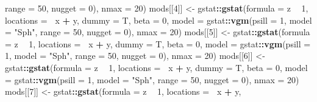 \documentclass[
]{article}
\newenvironment{Shaded}{\begin{snugshade}}{\end{snugshade}}
\newcommand{\DataTypeTok}[1]{\textcolor[rgb]{0.13,0.29,0.53}{#1}}
\newcommand{\DecValTok}[1]{\textcolor[rgb]{0.00,0.00,0.81}{#1}}
\newcommand{\KeywordTok}[1]{\textcolor[rgb]{0.13,0.29,0.53}{\textbf{#1}}}
\newcommand{\NormalTok}[1]{#1}
\newcommand{\OperatorTok}[1]{\textcolor[rgb]{0.81,0.36,0.00}{\textbf{#1}}}
\newcommand{\StringTok}[1]{\textcolor[rgb]{0.31,0.60,0.02}{#1}}
\begin{document}
\begin{Shaded}
\begin{Highlighting}[]
        \DataTypeTok{range =} \DecValTok{50}\NormalTok{, }\DataTypeTok{nugget =} \DecValTok{0}\NormalTok{), }\DataTypeTok{nmax =} \DecValTok{20}\NormalTok{)}
\NormalTok{mods[[}\DecValTok{4}\NormalTok{]] <-}\StringTok{ }\NormalTok{gstat}\OperatorTok{::}\KeywordTok{gstat}\NormalTok{(}\DataTypeTok{formula =}\NormalTok{ z }\OperatorTok{~}\StringTok{ }\DecValTok{1}\NormalTok{, }\DataTypeTok{locations =} \OperatorTok{~}\NormalTok{x }\OperatorTok{+}\StringTok{ }\NormalTok{y, }
    \DataTypeTok{dummy =}\NormalTok{ T, }\DataTypeTok{beta =} \DecValTok{0}\NormalTok{, }\DataTypeTok{model =}\NormalTok{ gstat}\OperatorTok{::}\KeywordTok{vgm}\NormalTok{(}\DataTypeTok{psill =} \DecValTok{1}\NormalTok{, }\DataTypeTok{model =} \StringTok{"Sph"}\NormalTok{, }
        \DataTypeTok{range =} \DecValTok{50}\NormalTok{, }\DataTypeTok{nugget =} \DecValTok{0}\NormalTok{), }\DataTypeTok{nmax =} \DecValTok{20}\NormalTok{)}
\NormalTok{mods[[}\DecValTok{5}\NormalTok{]] <-}\StringTok{ }\NormalTok{gstat}\OperatorTok{::}\KeywordTok{gstat}\NormalTok{(}\DataTypeTok{formula =}\NormalTok{ z }\OperatorTok{~}\StringTok{ }\DecValTok{1}\NormalTok{, }\DataTypeTok{locations =} \OperatorTok{~}\NormalTok{x }\OperatorTok{+}\StringTok{ }\NormalTok{y, }
    \DataTypeTok{dummy =}\NormalTok{ T, }\DataTypeTok{beta =} \DecValTok{0}\NormalTok{, }\DataTypeTok{model =}\NormalTok{ gstat}\OperatorTok{::}\KeywordTok{vgm}\NormalTok{(}\DataTypeTok{psill =} \DecValTok{1}\NormalTok{, }\DataTypeTok{model =} \StringTok{"Sph"}\NormalTok{, }
        \DataTypeTok{range =} \DecValTok{50}\NormalTok{, }\DataTypeTok{nugget =} \DecValTok{0}\NormalTok{), }\DataTypeTok{nmax =} \DecValTok{20}\NormalTok{)}
\NormalTok{mods[[}\DecValTok{6}\NormalTok{]] <-}\StringTok{ }\NormalTok{gstat}\OperatorTok{::}\KeywordTok{gstat}\NormalTok{(}\DataTypeTok{formula =}\NormalTok{ z }\OperatorTok{~}\StringTok{ }\DecValTok{1}\NormalTok{, }\DataTypeTok{locations =} \OperatorTok{~}\NormalTok{x }\OperatorTok{+}\StringTok{ }\NormalTok{y, }
    \DataTypeTok{dummy =}\NormalTok{ T, }\DataTypeTok{beta =} \DecValTok{0}\NormalTok{, }\DataTypeTok{model =}\NormalTok{ gstat}\OperatorTok{::}\KeywordTok{vgm}\NormalTok{(}\DataTypeTok{psill =} \DecValTok{1}\NormalTok{, }\DataTypeTok{model =} \StringTok{"Sph"}\NormalTok{, }
        \DataTypeTok{range =} \DecValTok{50}\NormalTok{, }\DataTypeTok{nugget =} \DecValTok{0}\NormalTok{), }\DataTypeTok{nmax =} \DecValTok{20}\NormalTok{)}
\NormalTok{mods[[}\DecValTok{7}\NormalTok{]] <-}\StringTok{ }\NormalTok{gstat}\OperatorTok{::}\KeywordTok{gstat}\NormalTok{(}\DataTypeTok{formula =}\NormalTok{ z }\OperatorTok{~}\StringTok{ }\DecValTok{1}\NormalTok{, }\DataTypeTok{locations =} \OperatorTok{~}\NormalTok{x }\OperatorTok{+}\StringTok{ }\NormalTok{y, }

\end{Highlighting}
\end{Shaded}
\end{document}
